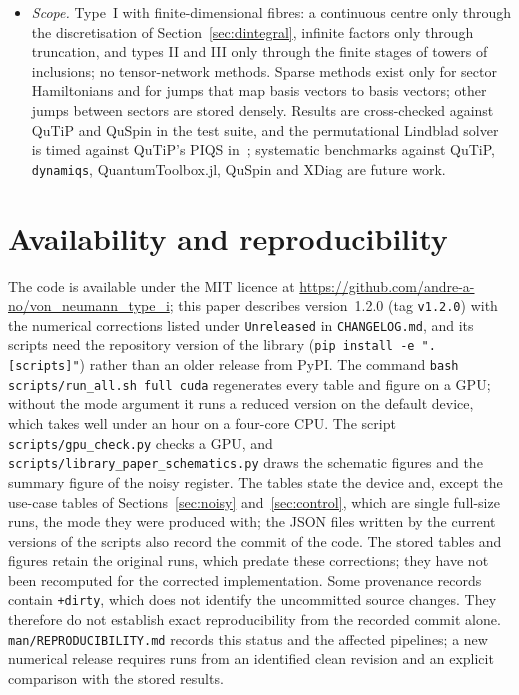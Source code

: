 \documentclass[11pt]{article}
\begin{document}
\begin{itemize}
sparse measurements, training viewed as a dynamics of the channel and certified upper bounds for the learned maps are
not implemented; the plan is kept in the repository (\texttt{ROADMAP\_learning.md}).
\item \emph{Scope.} Type~I with finite-dimensional fibres: a continuous centre only through the discretisation of
Section~\ref{sec:dintegral}, infinite factors only through truncation, and types II and III only through the finite stages
of towers of inclusions; no tensor-network methods. Sparse methods exist only for sector
Hamiltonians and for jumps that map basis vectors to basis vectors; other jumps between sectors are stored densely.
Results are cross-checked against QuTiP and QuSpin in the test suite, and the permutational Lindblad solver is timed
against QuTiP's PIQS in~\cite{nn_btc}; systematic benchmarks against QuTiP, \texttt{dynamiqs}, QuantumToolbox.jl, QuSpin
and XDiag are future work.
\end{itemize}

\section{Availability and reproducibility}\label{sec:availability}

The code is available under the MIT licence at \url{https://github.com/andre-a-no/von_neumann_type_i}; this paper
describes version~1.2.0 (tag \texttt{v1.2.0}) with the numerical corrections listed under \texttt{Unreleased} in
\texttt{CHANGELOG.md}, and its scripts need the repository version of the library
(\texttt{pip install -e ".[scripts]"}) rather than an older release from PyPI. The command
\texttt{bash scripts/run\_all.sh full cuda} regenerates every table and figure on a GPU; without the mode argument it
runs a reduced version on the default device, which takes well under an hour on a four-core CPU. The script
\texttt{scripts/\allowbreak gpu\_check.py} checks a GPU, and \texttt{scripts/\allowbreak library\_paper\_schematics.py}
draws the schematic figures and the summary figure of the noisy register. The tables state the device and, except the
use-case tables of Sections~\ref{sec:noisy} and~\ref{sec:control}, which are single full-size runs, the mode they were
produced with; the JSON files written by the current versions of the scripts also record the commit of the code.
The stored tables and figures retain the original runs, which predate these corrections; they have not been
recomputed for the corrected implementation. Some provenance records contain \texttt{+dirty}, which does not
identify the uncommitted source changes. They therefore do not establish exact reproducibility from the recorded
commit alone. \texttt{man/REPRODUCIBILITY.md} records this status and the affected pipelines; a new numerical release
requires runs from an identified clean revision and an explicit comparison with the stored results.
\end{document}

